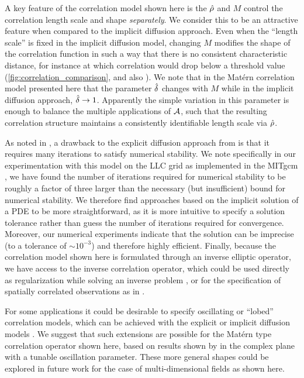 A key feature of the correlation model shown here is the $\hat{\rho}$ and $M$
control the correlation length scale and shape \textit{separately}.
We consider this to be an attractive feature when compared to the implicit
diffusion approach.
Even when the ``length scale'' is fixed in the implicit diffusion model, changing $M$
modifies the shape of the correlation function in such a way that there is no
consistent characteristic distance, for instance at which correlation would drop below a
threshold value
(\cref{fig:correlation_comparison}, and also
\citet[Figs. 1 and 2 of][]{guillet_modelling_2019}).
We note that in the Mat\'ern correlation model presented here that the parameter
$\hat{\delta}$ changes with $M$ while in the implicit diffusion approach, $\hat{\delta}
\rightarrow 1$.
Apparently the simple variation in this parameter is enough to balance the
multiple applications of $\mathcal{A}$, such that the resulting correlation
structure maintains a consistently identifiable length scale via $\hat{\rho}$.

As noted in \citet{mirouze_representation_2010,carrier_background-error_2010}, a
drawback to the explicit diffusion approach from
\citet{weaver_correlation_2001} is that it requires many iterations to satisfy
numerical stability.
We note specifically in our experimentation with this model on the LLC grid
as implemented in the MITgcm \citep{campin_mitgcmmitgcm_2021}, we have found
the number of iterations required for numerical stability to be roughly a factor
of three larger than the necessary (but insufficient) bound for numerical
stability.
We therefore find approaches based on the implicit solution of a PDE to be more
straightforward, as it is more intuitive to specify a solution tolerance
rather than guess the number of iterations required for convergence.
Moreover, our numerical experiments indicate that the solution can be imprecise
(to a tolerance of $\sim10^{-3}$) and therefore highly efficient.
Finally, because the correlation model shown here is formulated through an
inverse elliptic operator, we have access to the inverse correlation operator,
which could be used directly as regularization while solving an inverse problem
\citep[e.g.][]{bui-thanh_computational_2013}, or for the specification of
spatially correlated observations as in \citet{guillet_modelling_2019}.

For some applications it could be desirable to specify oscillating or ``lobed''
correlation models, which can be achieved with the explicit or implicit
diffusion models \citep{weaver_correlation_2001,weaver_diffusion_2013}.
We suggest that such extensions are possible for the Mat\'ern type correlation
operator shown here, based on results shown by \citet{RSSB:RSSB777} in the
complex plane with a tunable oscillation parameter.
These more general shapes could be explored in future work for the case of
multi-dimensional fields as shown here.
